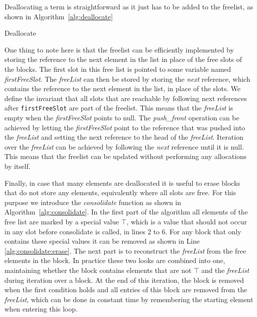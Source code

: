 \documentclass[10pt,a4paper]{article}
\theoremstyle{definition}
\begin{document}
\noindent Deallocating a term is straightforward as it just has to be added to the freelist, as shown in Algorithm~\ref{alg:deallocate}

\begin{algorithm}[H]
  \caption{Deallocate}\label{alg:deallocate}
  \begin{algorithmic}[1]
    \EndProcedure
  \end{algorithmic}
\end{algorithm}

\noindent One thing to note here is that the freelist can be efficiently implemented by storing the reference to the next element in the list in place of the free slots of the blocks.
The first slot in this free list is pointed to some variable named \emph{firstFreeSlot}.
The \emph{freeList} can then be stored by storing the \emph{next} reference, which contains the reference to the next element in the list, in place of the slots.
We define the invariant that all slots that are reachable by following next references after \texttt{firstFreeSlot} are part of the freelist.
This means that the \emph{freeList} is empty when the \emph{firstFreeSlot} points to null.
The \emph{push\_front} operation can be achieved by letting the \emph{firstFreeSlot} point to the reference that was pushed into the \emph{freeList} and setting the next reference to the head of the \emph{freeList}.
Iteration over the \emph{freeList} can be achieved by following the \emph{next} reference until it is null.
This means that the freelist can be updated without performing any allocations by itself.

Finally, in case that many elements are deallocated it is useful to erase blocks that do not store any elements, equivalently where all slots are free.
For this purpose we introduce the \emph{consolidate} function as shown in Algorithm~\ref{alg:consolidate}.
In the first part of the algorithm all elements of the free list are marked by a special value $\top$, which is a value that should not occur in any slot before consolidate is called, in lines 2 to 6.
For any block that only contains these special values it can be removed as shown in Line \ref{alg:consolidate:erase}.
The next part is to reconstruct the \emph{freeList} from the free elements in the block.
In practice these two looks are combined into one, maintaining whether the block contains elements that are not $\top$ and the \emph{freeList} during iteration over a block.
At the end of this iteration, the block is removed when the first condition holds and all entries of this block are removed from the \emph{freeList}, which can be done in constant time by remembering the starting element when entering this loop.
\end{document}
